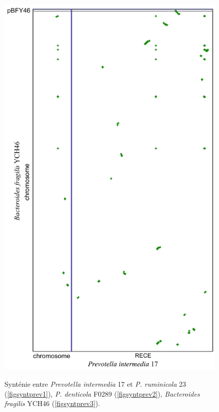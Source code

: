 \begin{figure}[H]
\begin{center}
\begin{minipage}{0.5\textwidth}
   \includegraphics[width=1.1\textwidth]{./img/synteny/new/fig8_15c.png}
   \label{figsyntprev3}
    \end{minipage}
    \end{center}
    \hspace*{-2cm}
    \begin{minipage}{1.2\textwidth}
    \vspace*{-0.5cm}
   \caption[Synténie de \textit{Prevotella} \textit{vs.} autres Bacteroidetes]{Synténie entre \textit{Prevotella intermedia} 17 et \textit{P. ruminicola} 23 (\ref{figsyntprev1}), \textit{P. denticola} F0289 (\ref{figsyntprev2}), \textit{Bacteroides fragilis} YCH46 (\ref{figsyntprev3}).}\label{figsyntprev}
       \end{minipage}
\end{figure}  

